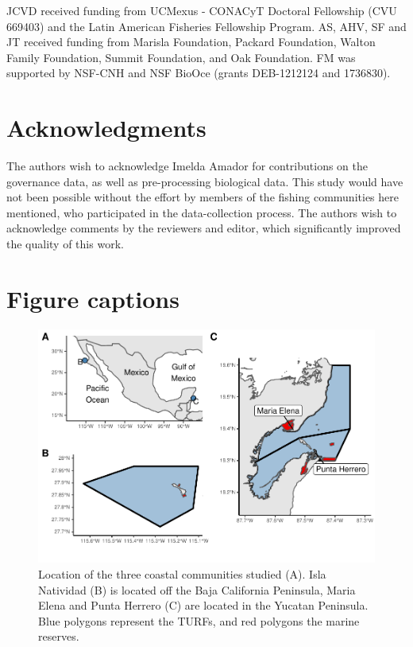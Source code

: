 \documentclass{frontiersSCNS}
\begin{document}
JCVD received funding from UCMexus - CONACyT Doctoral Fellowship (CVU 669403) and the Latin American Fisheries Fellowship Program. AS, AHV, SF and JT received funding from Marisla Foundation, Packard Foundation, Walton Family Foundation, Summit Foundation, and Oak Foundation. FM was supported by NSF-CNH and NSF BioOce (grants DEB-1212124 and 1736830).

\section*{Acknowledgments}

The authors wish to acknowledge Imelda Amador for contributions on the governance data, as well as pre-processing biological data. This study would have not been possible without the effort by members of the fishing communities here mentioned, who participated in the data-collection process. The authors wish to acknowledge comments by the reviewers and editor, which significantly improved the quality of this work.

\clearpage




\clearpage

\section*{Figure captions}

\begin{figure}
\centering
\includegraphics{manuscript_files/figure-latex/unnamed-chunk-7-1.pdf}
\caption{\label{fig:unnamed-chunk-7}\label{fig:map}Location of the three coastal communities studied (A). Isla Natividad (B) is located off the Baja California Peninsula, Maria Elena and Punta Herrero (C) are located in the Yucatan Peninsula. Blue polygons represent the TURFs, and red polygons the marine reserves.}
\end{figure}
\end{document}
